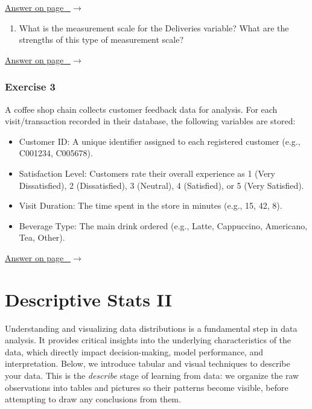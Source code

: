 \documentclass[
  11pt,
  letterpaper,
  DIV=11,
  numbers=noendperiod,
  oneside,
  open=any]{scrreprt}
\providecommand{\tightlist}{%
  \setlength{\itemsep}{0pt}\setlength{\parskip}{0pt}}\usepackage{longtable,booktabs,array}
\newcommand{\bsanswerref}[1]{%
  \par\nopagebreak\hypertarget{q-#1}{}\label{q-#1}%
  {\raggedleft\sffamily\footnotesize\hyperlink{a-#1}{\textcolor{bsaccent}{Answer on page \pageref{a-#1}\ $\rightarrow$}}\par}%
  \medskip}
\begin{document}
\bsanswerref{bsans4}

\begin{enumerate}
\def\labelenumi{\arabic{enumi}.}
\setcounter{enumi}{2}
\tightlist
\item
  What is the measurement scale for the Deliveries variable? What are
  the strengths of this type of measurement scale?
\end{enumerate}

\bsanswerref{bsans5}

\subsection*{Exercise 3}\label{exercise-3}

A coffee shop chain collects customer feedback data for analysis. For
each visit/transaction recorded in their database, the following
variables are stored:

\begin{itemize}
\tightlist
\item
  Customer ID: A unique identifier assigned to each registered customer
  (e.g., C001234, C005678).
\item
  Satisfaction Level: Customers rate their overall experience as 1 (Very
  Dissatisfied), 2 (Dissatisfied), 3 (Neutral), 4 (Satisfied), or 5
  (Very Satisfied).
\item
  Visit Duration: The time spent in the store in minutes (e.g., 15, 42,
  8).
\item
  Beverage Type: The main drink ordered (e.g., Latte, Cappuccino,
  Americano, Tea, Other).
\end{itemize}

\bsanswerref{bsans6}

\chapter{Descriptive Stats II}\label{descriptive-stats-ii}

Understanding and visualizing data distributions is a fundamental step
in data analysis. It provides critical insights into the underlying
characteristics of the data, which directly impact decision-making,
model performance, and interpretation. Below, we introduce tabular and
visual techniques to describe your data. This is the \emph{describe}
stage of learning from data: we organize the raw observations into
tables and pictures so their patterns become visible, before attempting
to draw any conclusions from them.
\end{document}
